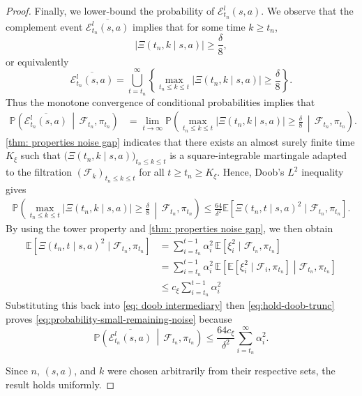 \begin{proof}
Finally, we lower-bound the probability of $\mathcal E^l_{t_n}(s,a)$.
We observe that the complement event $\overline{\mathcal E^l_{t_n}(s,a)}$ implies that for some time $k \ge t_{n}$,
\[
\bigl| \Xi(t_n, k \mid s,a)\bigr|
\ge \frac{\delta}{8} ,
\]
or equivalently
\[
\overline{\mathcal E^l_{t_n}(s,a)}
=
\bigcup_{t = t_n}^\infty
\left\{
\max_{t_n\le k\le t}|\Xi(t_n,k\mid s,a)|
\ge \frac{\delta}{8}
\right\} .
\]
Thus the monotone convergence of conditional probabilities implies that
\begin{align}
\label{eq:hold-doob-trunc}
\mathbb P\!\left(
\overline{\mathcal E^l_{t_n}(s,a)}
\,\middle|\,
\mathcal F_{t_n},\pi_{t_n}
\right)
&=
\lim_{t \to \infty}
\mathbb P\!\left(
\max_{t_n \le k \le t}| \Xi(t_n, k\mid s,a) |
\ge \frac{\delta}{8}
\,\middle|\,
\mathcal F_{t_n},\pi_{t_n}
\right) .
\end{align}
\autoref{thm: properties noise gap} indicates that there exists an almost surely finite time $K_\xi$ such that
$\big(\Xi(t_n, k \mid s,a)\big)_{t_n\le k \le t}$ is a square-integrable martingale adapted to the filtration $(\mathcal F_{k})_{t_n \le k\le t}$ for all $t \ge t_n \ge K_\xi$.
Hence, Doob's $L^2$ inequality gives
\begin{align}
\label{eq: doob intermediary}    
\mathbb P\!\left(
\max_{t_n \le k \le t} \bigl| \Xi(t_n, k \mid s,a)\bigr|
\ge \frac{\delta}{8}
\,\middle|\,
\mathcal F_{t_n}, \pi_{t_n}
\right)
\le
\frac{64}{\delta^2}
\mathbb E\!\left[\Xi(t_n,t\mid s,a)^2\mid \mathcal F_{t_n}, \pi_{t_n} \right].
\end{align}
By using the tower property and \autoref{thm: properties noise gap}, we then obtain
\begin{align*}
\mathbb E\!\left[\Xi(t_n, t \mid s,a)^2\mid \mathcal F_{t_n}, \pi_{t_n} \right]
&=
\sum_{i=t_n}^{t-1} \alpha_{i}^2\,
\mathbb E\!\left[\xi_{i}^2\mid \mathcal F_{t_n}, \pi_{t_n} \right]
\\
&=
\sum_{i=t_n}^{t-1} \alpha_{i}^2\,
\mathbb E\!\left[
\mathbb E\!\left[\xi_{i}^2\mid \mathcal F_{i}, \pi_{t_n}\right]
\middle|\mathcal F_{t_n} , \pi_{t_n}
\right]
\\
&\le
c_\xi \sum_{i=t_n}^{t-1} \alpha_{i}^2
\end{align*} 
Substituting this back into \eqref{eq: doob intermediary} then \eqref{eq:hold-doob-trunc} proves \eqref{eq:probability-small-remaining-noise} because
\[
\mathbb P\!\left(
\overline{\mathcal E^l_{t_n}(s,a)}
\,\middle|\,
\mathcal F_{t_n}, \pi_{t_n}
\right)
\le
\frac{64 c_\xi}{\delta^2}\sum_{i=t_n}^{\infty} \alpha_{i}^2 .
\]

Since $n$, $(s,a)$, and $k$ were chosen arbitrarily from their respective sets, the result holds uniformly.
\end{proof}

